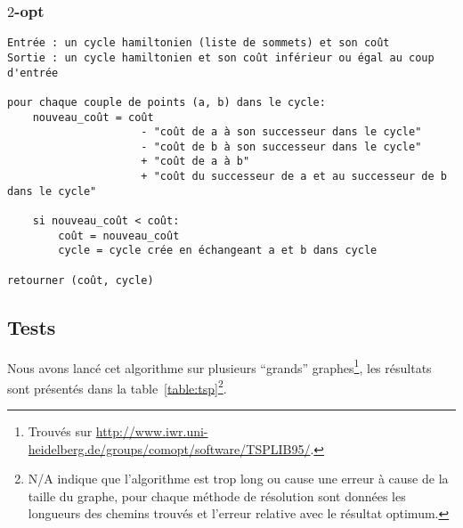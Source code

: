 \documentclass{scrartcl}
\begin{document}
    \subsubsection{$2$-opt}
      \begin{lstlisting}
Entrée : un cycle hamiltonien (liste de sommets) et son coût
Sortie : un cycle hamiltonien et son coût inférieur ou égal au coup d'entrée

pour chaque couple de points (a, b) dans le cycle:
    nouveau_coût = coût
                     - "coût de a à son successeur dans le cycle"
                     - "coût de b à son successeur dans le cycle"
                     + "coût de a à b"
                     + "coût du successeur de a et au successeur de b dans le cycle"

    si nouveau_coût < coût:
        coût = nouveau_coût
        cycle = cycle crée en échangeant a et b dans cycle

retourner (coût, cycle)
      \end{lstlisting}

  \subsection{Tests}
    Nous avons lancé cet algorithme sur plusieurs ``grands''
    graphes\footnote{Trouvés sur
      \url{http://www.iwr.uni-heidelberg.de/groups/comopt/software/TSPLIB95/}.
    }, les résultats sont présentés dans la table~\ref{table:tsp}\footnote{N/A
    indique que l'algorithme est trop long ou cause une erreur à cause de la
    taille du graphe, pour chaque méthode de résolution sont données les
    longueurs des chemins trouvés et l'erreur relative avec le résultat
    optimum.}.
\end{document}
